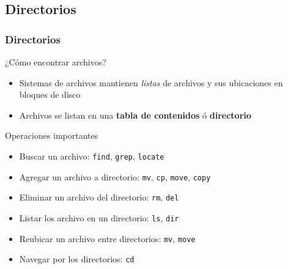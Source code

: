 \documentclass[letter]{beamer}
\begin{document}
\subsection{Directorios}

\begin{frame}
  \frametitle{Directorios}

  ¿Cómo encontrar archivos?
  
  \begin{itemize}
    \item Sistemas de archivos mantienen {\em listas} de archivos y sus ubicaciones
          en bloques de disco
    \item Archivos se listan en una {\bf tabla de contenidos} ó {\bf directorio}
  \end{itemize}
  
  Operaciones importantes
  \begin{itemize}
    \item Buscar un archivo: {\tt find}, {\tt grep}, {\tt locate}
    \item Agregar un archivo a directorio: {\tt mv}, {\tt cp}, {\tt move}, {\tt copy}
    \item Eliminar un archivo del directorio: {\tt rm}, {\tt del}
    \item Listar los archivo en un directorio: {\tt ls}, {\tt dir}
    \item Reubicar un archivo entre directorios: {\tt mv}, {\tt move}
    \item Navegar por los directorios: {\tt cd}
  \end{itemize}
\end{frame}
\end{document}
